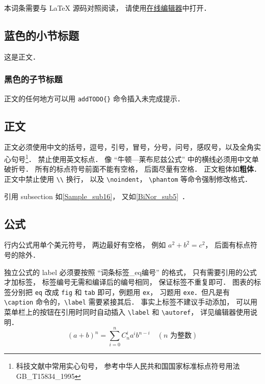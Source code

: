 
\begin{issues}
\issueDraft
\issueTODO
\issueMissDepend
\issueAbstract
\issueNeedCite
\end{issues}


本词条需要与 LaTeX 源码对照阅读， 请使用\href{https://wuli.wiki/editor}{在线编辑器}中打开．

\subsection{蓝色的小节标题}
这是正文．
\subsubsection{黑色的子节标题}
正文的任何地方可以用 \verb|addTODO{}| 命令插入未完成提示．

\subsection{正文}\label{Sample_sub16}
正文必须使用中文的括号，逗号，引号，冒号，分号，问号，感叹号，以及全角实心句号\footnote{科技文献中常用实心句号， 参考中华人民共和国国家标准标点符号用法 GB\_T15834\_1995}． 禁止使用英文标点． 像 “牛顿—莱布尼兹公式” 中的横线必须用中文单破折号． 所有的标点符号前面不能有空格， 后面尽量有空格． 正文粗体如\textbf{粗体}． 正文中禁止使用 \verb|\\| 换行， 以及 \verb|\noindent|， \verb|\phantom| 等命令强制修改格式．

引用 subsection 如\autoref{Sample_sub16}， 又如\autoref{BiNor_sub5}~．

\subsection{公式}
行内公式用单个美元符号， 两边最好有空格， 例如 $a^2+b^2=c^2$， 后面有标点符号的除外．

独立公式的 label 必须要按照 “词条标签\_eq编号” 的格式， 只有需要引用的公式才加标签， 标签编号无需和编译后的编号相同， 保证标签不重复即可． 图表的标签分别把 \verb|eq| 改成 \verb|fig| 和 \verb|tab| 即可，例题用 \verb|ex|， 习题用 \verb|exe|．但凡是有 \verb|\caption| 命令的，\verb|\label| 需要紧接其后． 事实上标签不建议手动添加， 可以用菜单栏上的按钮在引用时同时自动插入 \verb|\label| 和 \verb|\autoref|， 详见编辑器使用说明．
\begin{equation}\label{Sample_eq1}
(a+b)^n = \sum_{i=0}^n C_n^i a^i b^{n-i} \quad (\text{$n$ 为整数})
\end{equation}

